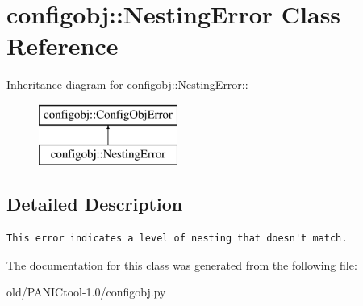 \section{configobj::Nesting\-Error Class Reference}
\label{classconfigobj_1_1NestingError}
Inheritance diagram for configobj::Nesting\-Error::\begin{figure}[H]
\begin{center}
\leavevmode
\includegraphics[height=2cm]{classconfigobj_1_1NestingError}
\end{center}
\end{figure}


\subsection{Detailed Description}


\footnotesize\begin{verbatim}
This error indicates a level of nesting that doesn't match.
\end{verbatim}
\normalsize
 



The documentation for this class was generated from the following file:\begin{CompactItemize}
\item 
old/PANICtool-1.0/configobj.py\end{CompactItemize}
